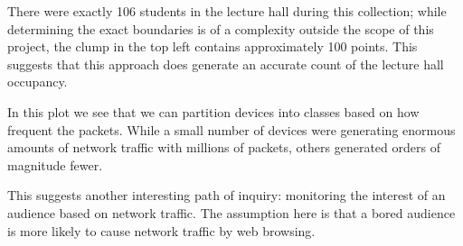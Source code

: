 There were exactly 106 students in the lecture hall during this collection; while determining the exact boundaries is of a complexity outside the scope of this project, the clump in the top left contains approximately 100 points.
This suggests that this approach does generate an accurate count of the lecture hall occupancy.

In this plot we see that we can partition devices into classes based on how frequent the packets.
While a small number of devices were generating enormous amounts of network traffic with millions of packets, others generated orders of magnitude fewer.
	
This suggests another interesting path of inquiry: monitoring the interest of an audience based on network traffic.
The assumption here is that a bored audience is more likely to cause network traffic by web browsing.

\FloatBarrier
